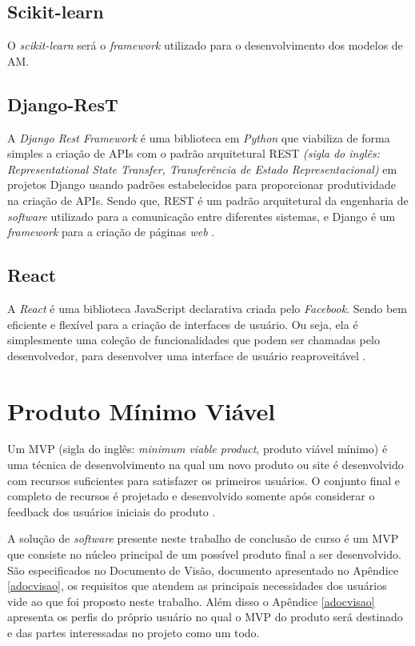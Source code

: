 \subsection{Scikit-learn}
O \textit{scikit-learn} será o \textit{framework} utilizado para o desenvolvimento dos modelos de AM.
\subsection{Django-ResT}

A \textit{Django Rest Framework} é uma biblioteca em \textit{Python} que viabiliza de forma simples a criação de APIs com o padrão arquitetural REST \textit{(sigla do inglês: Representational State Transfer, Transferência de Estado Representacional)} em projetos Django usando padrões estabelecidos para proporcionar produtividade na criação de APIs. Sendo que, REST é um padrão arquitetural da engenharia de \textit{software} utilizado para a comunicação entre diferentes sistemas, e Django é um \textit{framework} para a criação de páginas \textit{web} \cite{christie2011django}.

\subsection{React}

A \textit{React} é uma biblioteca JavaScript declarativa criada pelo \textit{Facebook}. Sendo bem eficiente e flexível para a criação de interfaces de usuário. Ou seja, ela é simplesmente uma coleção de funcionalidades que podem ser chamadas pelo desenvolvedor, para desenvolver uma interface de usuário reaproveitável \cite{reactjs}.

\section{Produto Mínimo Viável}

Um MVP (sigla do inglês: \textit{minimum viable product}, produto viável mínimo) é uma técnica de desenvolvimento na qual um novo produto ou site é desenvolvido com recursos suficientes para satisfazer os primeiros usuários. O conjunto final e completo de recursos é projetado e desenvolvido somente após considerar o feedback dos usuários iniciais do produto \cite{MVP}.

A solução de \textit{software} presente neste trabalho de conclusão de curso é um MVP que consiste no núcleo principal de um possível produto final a ser desenvolvido. São especificados no Documento de Visão, documento apresentado no Apêndice \ref{adocvisao}, os requisitos que atendem as principais necessidades dos usuários vide ao que foi proposto neste trabalho. Além disso o Apêndice \ref{adocvisao} apresenta os perfis do próprio usuário no qual o MVP do produto será destinado e das partes interessadas no projeto como um todo.
